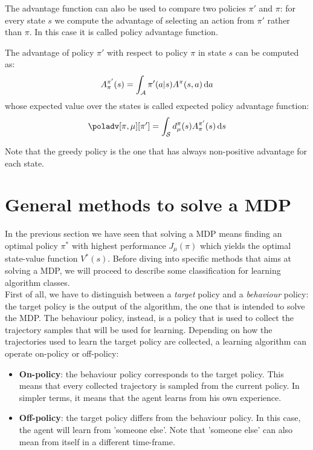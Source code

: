 The advantage function can also be used to compare two policies $\pi'$ and $\pi$: for every state $s$ we compute the advantage of selecting an action from $\pi'$ rather than $\pi$. In this case it is called policy advantage function.
\begin{definition}
The advantage of policy $\pi'$ with respect to policy $\pi$ in state $s$ can be computed as:
\[
A_\pi^{\pi'}(s) = \int_{\mathcal{A}} \pi'(a|s)A^\pi(s, a) \, \textrm{d} a
\]
whose expected value over the states is called expected policy advantage function:
\[
\poladv[\pi,\mu][\pi'] = \int_{\sspace} d_\mu^{\pi}(s)A_\pi^{\pi'}(s) \de s
\]
\end{definition}

Note that the greedy policy is the one that has always non-positive advantage for each state. 


\section{General methods to solve a MDP}
\label{sec:solve-mdp}
In the previous section we have seen that solving a MDP means finding an optimal policy $\pi^*$ with highest performance $J_\mu(\pi)$ which yields the optimal state-value function $V^*(s)$. Before diving into specific methods that aims at solving a MDP, we will proceed to describe some classification for learning algorithm classes.\\
First of all, we have to distinguish between a \textit{target} policy and a \textit{behaviour} policy: the target policy is the output of the algorithm, the one that is intended to solve the MDP. The behaviour policy, instead, is a policy that is used to collect the trajectory samples that will be used for learning. Depending on how the trajectories used to learn the target policy are collected, a learning algorithm can operate on-policy or off-policy:
\begin{itemize}
\item \textbf{On-policy}: the behaviour policy corresponds to the target policy. This means that every collected trajectory is sampled from the current policy. In simpler terms, it means that the agent learns from his own experience.
\item \textbf{Off-policy}: the target policy differs from the behaviour policy. In this case, the agent will learn from 'someone else'. Note that 'someone else' can also mean from itself in a different time-frame.
\end{itemize}

